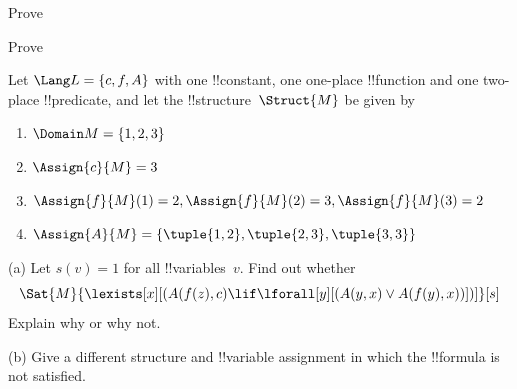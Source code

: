 \documentclass[../../../include/open-logic-section]{subfiles}
\begin{document}

\begin{prob}
  Prove 
\end{prob}
\tagendprob


\begin{prob}
  Prove 
\end{prob}
\tagendprob

\begin{prob}
Let $\Lang L = \{c, f, A\}$ with one !!{constant}, one one-place
!!{function} and one two-place !!{predicate}, and let the
!!{structure}~$\Struct{M}$ be given by
\begin{enumerate}
\item $\Domain M = \{1, 2, 3\}$
\item $\Assign{c}{M} = 3$
\item $\Assign{f}{M}(1) = 2, \Assign{f}{M}(2) = 3, \Assign{f}{M}(3) = 2$
\item $\Assign{A}{M} = \{\tuple{1, 2}, \tuple{2, 3}, \tuple{3, 3}\}$
\end{enumerate}
(a) Let $s(v) = 1$ for all !!{variable}s~$v$.  Find out whether
\[
\Sat{M}{\lexists[x][(A(f(z), c) \lif \lforall[y][(A(y, x) \lor A(f(y),
      x))])]}[s]
\]
Explain why or why not.

(b) Give a different structure and !!{variable} assignment in which the
!!{formula} is not satisfied.
\end{prob}
\end{document}
